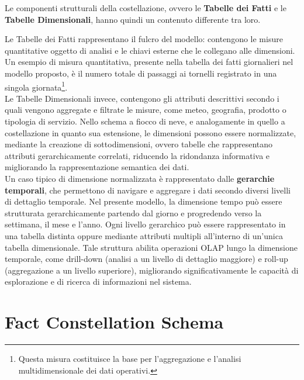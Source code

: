 Le componenti strutturali della costellazione, ovvero le \textbf{Tabelle dei Fatti} e le \textbf{Tabelle Dimensionali}, hanno quindi un contenuto differente tra loro.

Le Tabelle dei Fatti rappresentano il fulcro del modello: contengono le misure quantitative oggetto di analisi e le chiavi esterne che le collegano alle dimensioni. 
Un esempio di misura quantitativa, presente nella tabella dei fatti giornalieri nel modello proposto, è il numero totale di passaggi ai tornelli registrato in una singola giornata\footnote{Questa misura costituisce la base per l’aggregazione e l’analisi multidimensionale dei dati operativi.}.\\

Le Tabelle Dimensionali invece, contengono gli attributi descrittivi secondo i quali vengono aggregate e filtrate le misure, come meteo, geografia, prodotto o tipologia di servizio. Nello schema a fiocco di neve, e analogamente in quello a costellazione in quanto sua estensione, le dimensioni possono essere normalizzate, mediante la creazione di sottodimensioni, ovvero tabelle che rappresentano attributi gerarchicamente correlati, riducendo la ridondanza informativa e migliorando la rappresentazione semantica dei dati.\\

Un caso tipico di dimensione normalizzata è rappresentato dalle \textbf{gerarchie temporali}, che permettono di navigare e aggregare i dati secondo diversi livelli di dettaglio temporale. Nel presente modello, la dimensione tempo può essere strutturata gerarchicamente partendo dal giorno e progredendo verso la settimana, il mese e l’anno. Ogni livello gerarchico può essere rappresentato in una tabella distinta oppure mediante attributi multipli all’interno di un’unica tabella dimensionale. Tale struttura abilita operazioni OLAP lungo la dimensione temporale, come drill-down (analisi a un livello di dettaglio maggiore) e roll-up (aggregazione a un livello superiore), migliorando significativamente le capacità di esplorazione e di ricerca di informazioni nel sistema.\\









\section{Fact Constellation Schema}


